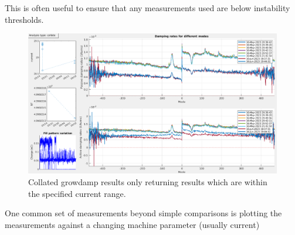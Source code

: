 \documentclass{report}
\begin{document}
This is often useful to ensure that any measurements used are below instability thresholds. 
\begin{figure}[h]
    \centering
    \includegraphics[width=1\linewidth]{growdamp_collate_limit_current_range.png}
    \caption{Collated growdamp results only returning results which are within the specified current range.}
    \label{fig:growdamp_collated_limit_current_range}
\end{figure}
One common set of measurements beyond simple comparisons is plotting the measurements against a changing machine parameter (usually current) 
\end{document}

